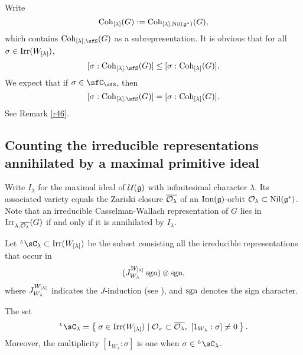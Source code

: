 \documentclass[counting_main.tex]{subfiles}
\begin{document}
Write
\[
  \mathrm{Coh}_{{[\lambda]}}(G):= \mathrm{Coh}_{{[\lambda]},\mathrm{Nil}(\mathfrak g^*)}(G),
\]
which contains $ \Coh_{\Lam,\sfS}(G)$ as a subrepresentation. It is obvious that for all $\sigma\in \mathrm{Irr}(W_{[\lambda]})$,
\begin{equation}\label{leq1}
  [\sigma: \Coh_{\Lam,\sfS}(G)]\leq [\sigma: \Coh_{\Lam}(G)].
\end{equation}
We expect that if $\sigma \in \sfC_{\sfS}$, then
\begin{equation}\label{leq1}
[\sigma: \Coh_{\Lam,\sfS}(G)]= [\sigma: \Coh_{\Lam}(G)].
\end{equation}
See Remark \ref{r46}. 






\subsection{Counting the irreducible representations annihilated by a maximal primitive ideal}
Write $I_\lambda$ for the maximal ideal of $\mathcal U(\mathfrak g)$ with infinitesimal
character $\lambda$. Its associated variety equals the Zariski closure
$\overline{{\mathcal {O}}_\lambda}$ of an $\mathrm{Inn}(\mathfrak g)$-orbit
${\mathcal {O}}_\lambda\subset\mathrm{Nil}(\mathfrak g^*) $. Note that an irreducible
Casselman-Wallach representation of $G$ lies in
$\mathrm{Irr}_{\lambda,\overline{{\mathcal {O}}_\lambda}}(G)$ if and only if it is annihilated by
$I_\lambda$.


Let $\LC_{\lambda}\subset \Irr(W_\Lam)$ be the subset consisting all the
irreducible representations that occur in
\[
  (J_{W_{\lambda}}^{W_{{[\lambda]}}} \operatorname{sgn} )\otimes \operatorname{sgn},
\]
where $J_{W_{\lambda}}^{W_{{[\lambda]}}} $ indicates the $J$-induction (see \cite[Chapter 12]{Carter}), and $\operatorname{sgn}$
denotes the sign character.



 \begin{prop}\label{lem:lcell.BV0}
   The set
   \[
     \LC_{\lambda} = \Set{\sigma\in \Irr(W_\Lam)\mid \CO_\sigma\subset \overline{\CO_\lambda}, \ [1_{W_{\lambda}}:\sigma]\neq 0}.
   \]
   Moreover, the multiplicity $[1_{W_{\lambda}}:\sigma]$ is one when
   $\sigma\in \LC_\lambda$.
 \end{prop}
\end{document}
